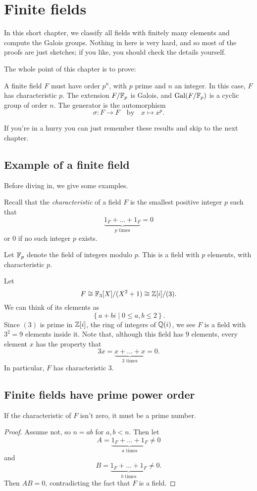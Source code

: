 \chapter{Finite fields}
In this short chapter, we classify all fields with finitely many elements
and compute the Galois groups.
Nothing in here is very hard, and so most of the proofs are just sketches;
if you like, you should check the details yourself.

The whole point of this chapter is to prove:
\begin{itemize}
	\ii A finite field $F$ must have order $p^n$, with $p$ prime and $n$ an integer.
	\ii In this case, $F$ has characteristic $p$.
	\ii The extension $F/\mathbb F_p$ is Galois, and $\operatorname{Gal}(F/\mathbb F_p)$ is a cyclic group of order $n$.
	The generator is the automorphism \[ \sigma : F \to F \quad\text{by}\quad x \mapsto x^p. \]
\end{itemize}
If you're in a hurry you can just remember these results and skip to the next chapter.

\section{Example of a finite field}
Before diving in, we give some examples.

Recall that the \emph{characteristic} of a field $F$
is the smallest positive integer $p$ such that
\[ \underbrace{1_F + \dots + 1_F}_{\text{$p$ times}} = 0 \]
or $0$ if no such integer $p$ exists.

\begin{example}
	Let $\mathbb F_p$ denote the field of integers modulo $p$.
	This is a field with $p$ elements, with characteristic $p$.
\end{example}

\begin{example}
	Let
	\[ F \cong \mathbb F_3[X]/(X^2+1) \cong \mathbb Z[i] / (3). \]
	We can think of its elements as \[ \left\{ a + bi \mid 0 \le a,b \le 2 \right\}. \]
	Since $(3)$ is prime in $\mathbb Z[i]$, the ring of integers of $\mathbb Q(i)$,
	we see $F$ is a field with $3^2 = 9$ elements inside it.
	Note that, although this field has $9$ elements, every element $x$ has the property that
	\[ 3x = \underbrace{x + \dots + x}_{\text{$3$ times}} = 0. \]
	In particular, $F$ has characteristic $3$.
\end{example}

\section{Finite fields have prime power order}
\begin{lemma}
	If the characteristic of $F$ isn't zero, it must be a prime number.
\end{lemma}
\begin{proof}
	Assume not, so $n = ab$ for $a,b < n$.
	Then let
	\[ A = \underbrace{1_F + \dots + 1_F}_{\text{$a$ times}} \neq 0 \]
	and
	\[ B = \underbrace{1_F + \dots + 1_F}_{\text{$b$ times}} \neq 0. \]
	Then $AB = 0$, contradicting the fact that $F$ is a field.
\end{proof}

